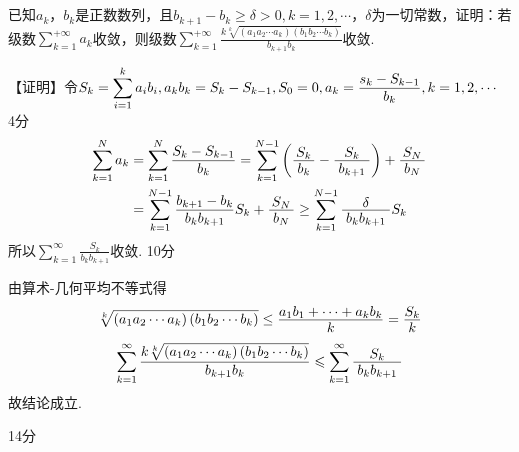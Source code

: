 \documentclass[11pt,twoside]{ctexart}
\begin{document}
\\\\
已知${a_k}$，${b_k}$是正数数列，且$b_{k+1}-b_k\geqslant\delta >0,k=1,2,\cdots $，$\delta$为一切常数，证明：若级数$\displaystyle\sum_{k=1}^{+\infty}{a_k}$收敛，则级数$\displaystyle\sum_{k=1}^{+\infty}{\displaystyle\frac{k\sqrt[k]{\left(a_1a_2\cdots a_k\right)\left(b_1b_2\cdots b_k\right)}}{b_{k+1}b_k}}$收敛.

【证明】令$S _ { k } = \displaystyle\sum _ { i = 1 } ^ { k } a _ { i } b _ { i } , a _ { k } b _ { k } = S _ { k } - S _ { k - 1 } , S _ { 0 } = 0 , a _ { k } = \displaystyle\zfrac { s _ { k } - S _ { k - 1 } } { b _ { k } } , k = 1,2 , \cdots$
\hfill\dotfill 4分
\begin{align*} 
	\sum _ { k = 1 } ^ { N } a _ { k } & = \sum _ { k = 1 } ^ { N } \zfrac { S _ { k } - S _ { k - 1 } } { b _ { k } } = \sum _ { k = 1 } ^ { N - 1 } \left( \zfrac { S _ { k } } { b _ { k } } - \zfrac { S _ { k } } { b _ { k + 1 } } \right) + \zfrac { S _ { N } } { b _ { N } } \\ 
	& = \sum _ { k = 1 } ^ { N - 1 } \zfrac { b _ { k + 1 } - b _ { k } } { b _ { k } b _ { k + 1 } } S _ { k } + \zfrac { S _ { N } } { b _ { N } } \geq \sum _ { k = 1 } ^ { N - 1 } \zfrac { \delta } { b _ { k } b _ { k + 1 } } S _ { k } 
\end{align*}
所以$\displaystyle\sum _ { k = 1 } ^ { \infty } \frac { S _ { k } } { b _ { k } b _ { k + 1 } }$收敛.
\hfill\dotfill 10分

由算术-几何平均不等式得
\[\sqrt [ k ] { \left( a _ { 1 } a _ { 2 } \cdots a _ { k } \right) \left( b _ { 1 } b _ { 2 } \cdots b _ { k } \right) } \leq \zfrac { a _ { 1 } b _ { 1 } + \cdots + a _ { k } b _ { k } } { k } = \zfrac { S _ { k } } { k }\]
\[\sum _ { k = 1 } ^ { \infty } \zfrac { k \sqrt [ k ] { \left( a _ { 1 } a _ { 2 } \cdots a _ { k } \right) \left( b _ { 1 } b _ { 2 } \cdots b _ { k } \right) } } { b _ { k + 1 } b _ { k } } \leqslant \sum _ { k = 1 } ^ { \infty } \zfrac { S _ { k } } { b _ { k } b _ { k + 1 } }\]
故结论成立.

\hfill\dotfill 14分
\mbox{}


\end{document}
